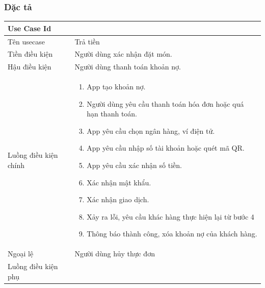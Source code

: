 \subsubsection{Dặc tả}
\begin{center}{\color{black}}

    \begin{tabular}{|p{5cm}|p{7cm}|} \hline
    
        \textbf{Use Case Id} & \textbf{}  \\ \hline
        Tên usecase &  Trả tiền\\ \hline
        Tiền điều kiện & Người dùng xác nhận đặt món.\\ \hline
        
        
        Hậu điều kiện &  Người dùng thanh toán khoản nợ.\\ \hline
        Luồng điều kiện chính &  
            \begin{enumerate}
                \item App tạo khoản nợ.
                \item Người dùng yêu cầu thanh toán hóa đơn hoặc quá hạn thanh toán.
                \item App yêu cầu chọn ngân hàng, ví điện tử.
                \item App yêu cầu nhập số tài khoản hoặc quét mã QR.
                \item App yêu cầu xác nhận số tiền.
				\item Xác nhận mật khẩu.
				\item Xác nhận giao dịch.
				\item Xảy ra lỗi, yêu cầu khác hàng thực hiện lại từ bước 4
				\item Thông báo thành công, xóa khoản nợ của khách hàng.
            \end{enumerate}\\
        \hline
        Ngoại lệ & Người dùng hủy thực đơn \\ \hline
        Luồng điều kiện phụ & \\ \hline
      
    \end{tabular}
\end{center}
